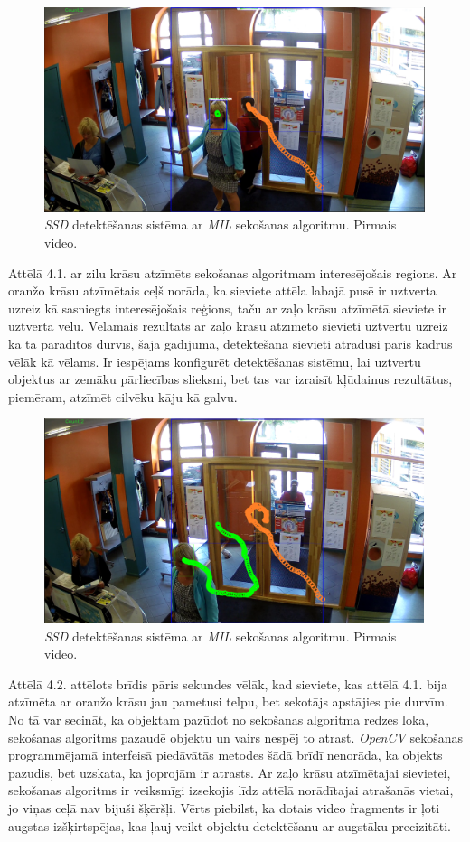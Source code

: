 \begin{figure}[h]%
	\centering
	\includegraphics[height=6cm]{images/ssd1.png} %
	\caption{\textit{SSD} detektēšanas sistēma ar \textit{MIL} sekošanas algoritmu. Pirmais video.}%
	\label{fig:example}%
\end{figure}
\newpage
Attēlā 4.1. ar zilu krāsu atzīmēts sekošanas algoritmam interesējošais reģions. Ar oranžo krāsu atzīmētais ceļš norāda, ka sieviete attēla labajā pusē ir uztverta uzreiz kā sasniegts interesējošais reģions, taču ar zaļo krāsu atzīmētā sieviete ir uztverta vēlu. Vēlamais rezultāts ar zaļo krāsu atzīmēto sievieti uztvertu uzreiz kā tā parādītos durvīs, šajā gadījumā, detektēšana sievieti atradusi pāris kadrus vēlāk kā vēlams. Ir iespējams konfigurēt detektēšanas sistēmu, lai uztvertu objektus ar zemāku pārliecības slieksni, bet tas var izraisīt kļūdainus rezultātus, piemēram, atzīmēt cilvēku kāju kā galvu.

\begin{figure}[h]%
	\centering
	\includegraphics[height=6cm]{images/ssd2.png} %
	\caption{\textit{SSD} detektēšanas sistēma ar \textit{MIL} sekošanas algoritmu. Pirmais video.}%
	\label{fig:example}%
\end{figure}

Attēlā 4.2. attēlots brīdis pāris sekundes vēlāk, kad sieviete, kas attēlā 4.1. bija atzīmēta ar oranžo krāsu jau pametusi telpu, bet sekotājs apstājies pie durvīm. No tā var secināt, ka objektam pazūdot no sekošanas algoritma redzes loka, sekošanas algoritms pazaudē objektu un vairs nespēj to atrast. \textit{OpenCV} sekošanas programmējamā interfeisā piedāvātās metodes šādā brīdī nenorāda, ka objekts pazudis, bet uzskata, ka joprojām ir atrasts. Ar zaļo krāsu atzīmētajai sievietei, sekošanas algoritms ir veiksmīgi izsekojis līdz attēlā norādītajai atrašanās vietai, jo viņas ceļā nav bijuši šķēršļi. Vērts piebilst, ka dotais video fragments ir ļoti augstas izšķirtspējas, kas ļauj veikt objektu detektēšanu ar augstāku precizitāti. 

